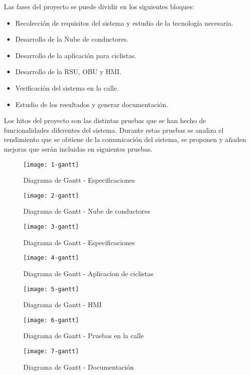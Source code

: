 Las fases del proyecto se puede dividir en los siguientes bloques:
\begin{itemize}
	\item Recolección de requisitos del sistema y estudio de la tecnología necesaria.
	\item Desarrollo de la Nube de conductores.
	\item Desarrollo de la aplicación para ciclistas.
	\item Desarrollo de la RSU, OBU y HMI.
	\item Verificación del sistema en la calle.
	\item Estudio de los resultados y generar documentación.
\end{itemize}

Los hitos del proyecto son las distintas pruebas que se han hecho de funcionalidades diferentes del sistema. Durante estas pruebas se analiza el rendimiento que se obtiene de la comunicación del sistema, se proponen y añaden mejoras que serán incluidas en siguientes pruebas.

\begin{figure}[t]
	\texttt{[image: 1-gantt]}
	\caption{Diagrama de Gantt - Especificaciones}
	\label{fig:gantt1}
\end{figure}
\begin{figure}
	\texttt{[image: 2-gantt]}
	\caption{Diagrama de Gantt - Nube de conductores}
	\label{fig:gantt2}
\end{figure}
\begin{figure}
	\texttt{[image: 3-gantt]}
	\caption{Diagrama de Gantt - Especificaciones}
	\label{fig:gantt3}
\end{figure}
\begin{figure}
	\texttt{[image: 4-gantt]}
	\caption{Diagrama de Gantt - Aplicacion de ciclistas}
	\label{fig:gantt4}
\end{figure}
\begin{figure}
	\texttt{[image: 5-gantt]}
	\caption{Diagrama de Gantt - HMI}
	\label{fig:gantt5}
\end{figure}
\begin{figure}
	\texttt{[image: 6-gantt]}
	\caption{Diagrama de Gantt - Pruebas en la calle}
	\label{fig:gantt6}
\end{figure}
\begin{figure}
	\texttt{[image: 7-gantt]}
	\caption{Diagrama de Gantt - Documentación}
	\label{fig:gantt7}
\end{figure}